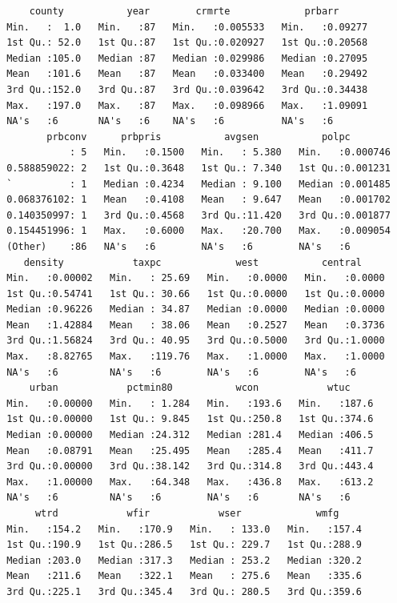 \documentclass[]{article}
\begin{document}
\begin{verbatim}
     county           year        crmrte             prbarr       
 Min.   :  1.0   Min.   :87   Min.   :0.005533   Min.   :0.09277  
 1st Qu.: 52.0   1st Qu.:87   1st Qu.:0.020927   1st Qu.:0.20568  
 Median :105.0   Median :87   Median :0.029986   Median :0.27095  
 Mean   :101.6   Mean   :87   Mean   :0.033400   Mean   :0.29492  
 3rd Qu.:152.0   3rd Qu.:87   3rd Qu.:0.039642   3rd Qu.:0.34438  
 Max.   :197.0   Max.   :87   Max.   :0.098966   Max.   :1.09091  
 NA's   :6       NA's   :6    NA's   :6          NA's   :6        
        prbconv      prbpris           avgsen           polpc         
            : 5   Min.   :0.1500   Min.   : 5.380   Min.   :0.000746  
 0.588859022: 2   1st Qu.:0.3648   1st Qu.: 7.340   1st Qu.:0.001231  
 `          : 1   Median :0.4234   Median : 9.100   Median :0.001485  
 0.068376102: 1   Mean   :0.4108   Mean   : 9.647   Mean   :0.001702  
 0.140350997: 1   3rd Qu.:0.4568   3rd Qu.:11.420   3rd Qu.:0.001877  
 0.154451996: 1   Max.   :0.6000   Max.   :20.700   Max.   :0.009054  
 (Other)    :86   NA's   :6        NA's   :6        NA's   :6         
    density            taxpc             west           central      
 Min.   :0.00002   Min.   : 25.69   Min.   :0.0000   Min.   :0.0000  
 1st Qu.:0.54741   1st Qu.: 30.66   1st Qu.:0.0000   1st Qu.:0.0000  
 Median :0.96226   Median : 34.87   Median :0.0000   Median :0.0000  
 Mean   :1.42884   Mean   : 38.06   Mean   :0.2527   Mean   :0.3736  
 3rd Qu.:1.56824   3rd Qu.: 40.95   3rd Qu.:0.5000   3rd Qu.:1.0000  
 Max.   :8.82765   Max.   :119.76   Max.   :1.0000   Max.   :1.0000  
 NA's   :6         NA's   :6        NA's   :6        NA's   :6       
     urban            pctmin80           wcon            wtuc      
 Min.   :0.00000   Min.   : 1.284   Min.   :193.6   Min.   :187.6  
 1st Qu.:0.00000   1st Qu.: 9.845   1st Qu.:250.8   1st Qu.:374.6  
 Median :0.00000   Median :24.312   Median :281.4   Median :406.5  
 Mean   :0.08791   Mean   :25.495   Mean   :285.4   Mean   :411.7  
 3rd Qu.:0.00000   3rd Qu.:38.142   3rd Qu.:314.8   3rd Qu.:443.4  
 Max.   :1.00000   Max.   :64.348   Max.   :436.8   Max.   :613.2  
 NA's   :6         NA's   :6        NA's   :6       NA's   :6      
      wtrd            wfir            wser             wmfg      
 Min.   :154.2   Min.   :170.9   Min.   : 133.0   Min.   :157.4  
 1st Qu.:190.9   1st Qu.:286.5   1st Qu.: 229.7   1st Qu.:288.9  
 Median :203.0   Median :317.3   Median : 253.2   Median :320.2  
 Mean   :211.6   Mean   :322.1   Mean   : 275.6   Mean   :335.6  
 3rd Qu.:225.1   3rd Qu.:345.4   3rd Qu.: 280.5   3rd Qu.:359.6  

\end{verbatim}
\end{document}
